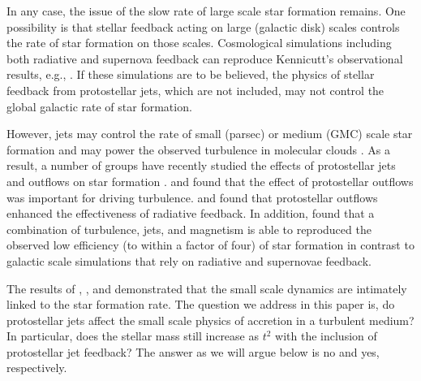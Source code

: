 \documentclass[../dissertation.tex]{subfiles}
\begin{document}
In any case, the issue of the slow rate of large scale star formation remains.
One possibility is that stellar feedback acting on large (galactic disk) scales controls the rate of star formation on those scales.
Cosmological simulations including both radiative and supernova feedback can reproduce Kennicutt's observational results, e.g., \cite{2011MNRAS.417..950H,2013ApJ...770...25A,2014MNRAS.445..581H}. If these simulations are to be believed, the physics of stellar feedback from protostellar jets, which are not included, may not control the global galactic rate of star formation.

However, jets may control the rate of small (parsec) or medium (GMC) scale star formation and may power the observed turbulence in molecular clouds \citep{2007ApJ...659.1394M}.
As a result, a number of groups have recently studied the effects of protostellar jets and outflows on star formation \citep{2010ApJ...709...27W,2014MNRAS.439.3420M,2015MNRAS.450.4035F}.
\citet{2007ApJ...662..395N} and \citet{2011ApJ...740...36N} found that the effect of protostellar outflows was important for driving turbulence.  \citet{2011ApJ...740..107C} and \citet{2012ApJ...747...22H} found that protostellar outflows enhanced the effectiveness of radiative feedback.  In addition, \citet{2015MNRAS.450.4035F} found that a combination of turbulence, jets, and magnetism is able to reproduced the observed low efficiency (to within a factor of four) of star formation in contrast to galactic scale simulations that rely on radiative and supernovae feedback.

The results of \citet{2015ApJ...800...49L}, \citet{2015ApJ...804...44M}, and \citet{2017MNRAS.465.1316M} demonstrated that the small scale dynamics are intimately linked to the star formation rate. The question we address in this paper is, do protostellar jets affect the small scale physics of accretion in a turbulent medium?  In particular, does the stellar mass still increase as $t^2$ with the inclusion of protostellar jet feedback?  The answer as we will argue below is no and yes, respectively.
\end{document}
